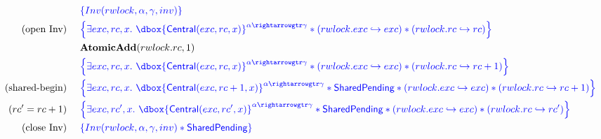 \documentclass{article}
\newcommand\dboxed[1]{\dbox{\vphantom{t}\ensuremath{#1}}}
\newcommand{\pointsto}{\hookrightarrow}
\newcommand{\refines}{\rightarrowgtr}
\begin{document}
\begin{align*}
& \inlinehoare{ \Inv(\rwlock,\alpha,\gamma,\inv) } \\
\text{(open Inv)} ~~~~ & \inlinehoare{
        \exists exc,rc,x .~
            \dboxed{\Central(exc,rc,x)}^{\alpha \refines \gamma}
            * (\rwlock.\exc \pointsto exc)
            * (\rwlock.\rc \pointsto rc)
    }\\
& \AtomicAdd(\rwlock.\rc, 1) \\
& \inlinehoare{
        \exists exc,rc,x .~
            \dboxed{\Central(exc,rc,x)}^{\alpha \refines \gamma}
            * (\rwlock.\exc \pointsto exc)
            * (\rwlock.\rc \pointsto rc + 1)
    }\\
\text{(shared-begin)} ~~~~ & \inlinehoare{
        \exists exc,rc,x .~
            \dboxed{\Central(exc,rc + 1,x)}^{\alpha \refines \gamma}
            * \SharedPending
            * (\rwlock.\exc \pointsto exc)
            * (\rwlock.\rc \pointsto rc + 1)
    }\\
(rc'=rc+1) ~~~~ & \inlinehoare{
        \exists exc,rc',x .~
            \dboxed{\Central(exc,rc',x)}^{\alpha \refines \gamma}
            * \SharedPending
            * (\rwlock.\exc \pointsto exc)
            * (\rwlock.\rc \pointsto rc')
    }\\
\text{(close Inv)} ~~~~ & \inlinehoare{ \Inv(\rwlock,\alpha,\gamma,\inv) * \SharedPending } \nonumber\\
\end{align*}
\end{document}
